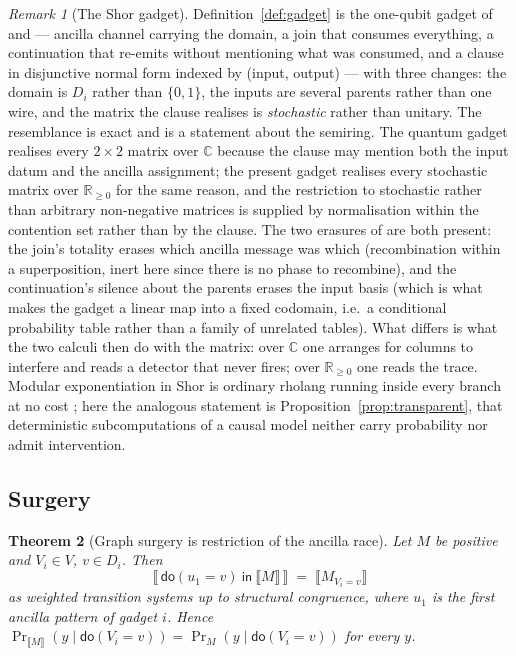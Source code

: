 \documentclass[11pt,a4paper]{article}
\theoremstyle{plain}
\newtheorem{theorem}{Theorem}[section]
\theoremstyle{definition}
\theoremstyle{remark}
\newtheorem{remark}[theorem]{Remark}
\newcommand{\sem}[1]{\llbracket #1 \rrbracket}
\newcommand{\Rnn}{\mathbb{R}_{\geq 0}}
\newcommand{\Cx}{\mathbb{C}}
\newcommand{\dok}{\textsf{do}}
\newcommand{\ink}{\textsf{in}}
\begin{document}
\begin{remark}[The Shor gadget]\label{rem:shor}
Definition~\ref{def:gadget} is the one-qubit gadget of \cite[Lemma~8.1]{GradedV4}
and \cite[\S10]{GradedQuantum} --- ancilla channel carrying the domain, a join
that consumes everything, a continuation that re-emits without mentioning what
was consumed, and a clause in disjunctive normal form indexed by (input, output)
--- with three changes: the domain is $D_i$ rather than $\{0,1\}$, the inputs
are several parents rather than one wire, and the matrix the clause realises is
\emph{stochastic} rather than unitary. The resemblance is exact and is a
statement about the semiring. The quantum gadget realises every $2 \times 2$
matrix over $\Cx$ because the clause may mention both the input datum and the
ancilla assignment; the present gadget realises every stochastic matrix over
$\Rnn$ for the same reason, and the restriction to stochastic rather than
arbitrary non-negative matrices is supplied by normalisation within the
contention set rather than by the clause. The two erasures of
\cite[Rem.~8.2]{GradedV4} are both present: the join's totality erases which
ancilla message was which (recombination within a superposition, inert here
since there is no phase to recombine), and the continuation's silence about the
parents erases the input basis (which is what makes the gadget a linear map
into a fixed codomain, i.e.\ a conditional probability table rather than a
family of unrelated tables). What differs is what the two calculi then do with
the matrix: over $\Cx$ one arranges for columns to interfere and reads a
detector that never fires; over $\Rnn$ one reads the trace. Modular
exponentiation in Shor is ordinary rholang running inside every branch at no
cost \cite[Cor.~8.6]{GradedV4}; here the analogous statement is
Proposition~\ref{prop:transparent}, that deterministic subcomputations of a
causal model neither carry probability nor admit intervention.
\end{remark}

\subsection{Surgery}

\begin{theorem}[Graph surgery is restriction of the ancilla race]
\label{thm:surgery}
Let $M$ be positive and $V_i \in V$, $v \in D_i$. Then
\[
  \sem{\,\dok(u_1 = v)\ \ink\ \sem{M}\,} \;=\; \sem{M_{V_i = v}}
\]
as weighted transition systems up to structural congruence, where $u_1$ is the
first ancilla pattern of gadget $i$. Hence
$\Pr_{\sem{M}}(y \mid \dok(V_i = v)) = \Pr_{M}(y \mid \dok(V_i = v))$ for every
$y$.
\end{theorem}
\end{document}
